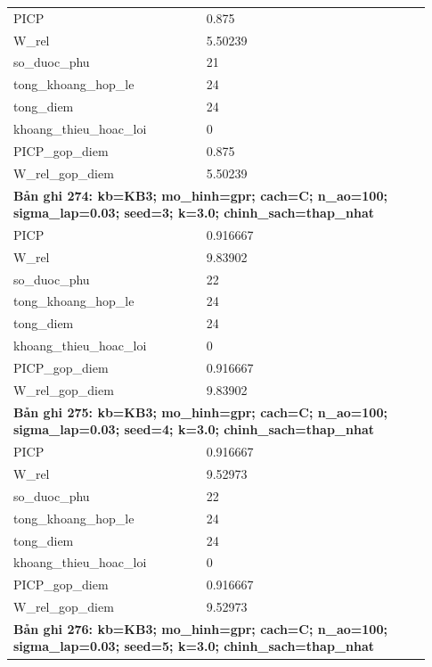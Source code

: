 \begin{longtable}{p{0.43\linewidth}p{0.50\linewidth}}
PICP & 0.875 \\
W\_\allowbreak rel & 5.50239 \\
so\_\allowbreak duoc\_\allowbreak phu & 21 \\
tong\_\allowbreak khoang\_\allowbreak hop\_\allowbreak le & 24 \\
tong\_\allowbreak diem & 24 \\
khoang\_\allowbreak thieu\_\allowbreak hoac\_\allowbreak loi & 0 \\
PICP\_\allowbreak gop\_\allowbreak diem & 0.875 \\
W\_\allowbreak rel\_\allowbreak gop\_\allowbreak diem & 5.50239 \\
\midrule
\multicolumn{2}{p{0.95\linewidth}}{\textbf{Bản ghi 274: kb=KB3; mo\_hinh=gpr; cach=C; n\_ao=100; sigma\_lap=0.03; seed=3; k=3.0; chinh\_sach=thap\_nhat}} \\
PICP & 0.916667 \\
W\_\allowbreak rel & 9.83902 \\
so\_\allowbreak duoc\_\allowbreak phu & 22 \\
tong\_\allowbreak khoang\_\allowbreak hop\_\allowbreak le & 24 \\
tong\_\allowbreak diem & 24 \\
khoang\_\allowbreak thieu\_\allowbreak hoac\_\allowbreak loi & 0 \\
PICP\_\allowbreak gop\_\allowbreak diem & 0.916667 \\
W\_\allowbreak rel\_\allowbreak gop\_\allowbreak diem & 9.83902 \\
\midrule
\multicolumn{2}{p{0.95\linewidth}}{\textbf{Bản ghi 275: kb=KB3; mo\_hinh=gpr; cach=C; n\_ao=100; sigma\_lap=0.03; seed=4; k=3.0; chinh\_sach=thap\_nhat}} \\
PICP & 0.916667 \\
W\_\allowbreak rel & 9.52973 \\
so\_\allowbreak duoc\_\allowbreak phu & 22 \\
tong\_\allowbreak khoang\_\allowbreak hop\_\allowbreak le & 24 \\
tong\_\allowbreak diem & 24 \\
khoang\_\allowbreak thieu\_\allowbreak hoac\_\allowbreak loi & 0 \\
PICP\_\allowbreak gop\_\allowbreak diem & 0.916667 \\
W\_\allowbreak rel\_\allowbreak gop\_\allowbreak diem & 9.52973 \\
\midrule
\multicolumn{2}{p{0.95\linewidth}}{\textbf{Bản ghi 276: kb=KB3; mo\_hinh=gpr; cach=C; n\_ao=100; sigma\_lap=0.03; seed=5; k=3.0; chinh\_sach=thap\_nhat}} \\

\end{longtable}
